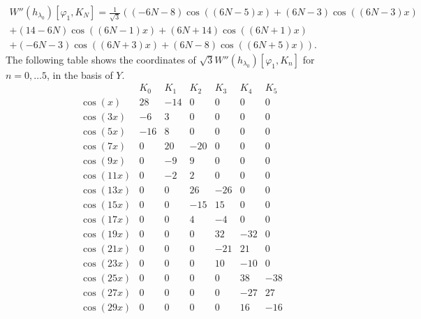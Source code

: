 \documentclass{amsart}
\begin{document}
\begin{multline}
	\label{eq_DW2}
	W''(h_{\lambda_0})[\varphi_1, K_N] =
	\frac 1{\sqrt 3} \left(
	(-6 N-8) \cos ((6 N-5) x)+(6 N-3) \cos ((6 N-3) x) \right. \\ \left. 
		+(14-6 N) \cos ((6 N-1) x)+(6 N+14) \cos ((6 N+1) x) \right. \\ \left. 
			+(-6 N-3) \cos ((6 N+3) x)+(6 N-8) \cos ((6 N+5) x)
\right).
\end{multline}
The following table shows the coordinates of $\sqrt 3 W''(h_{\lambda_0})[\varphi_1, K_n]$ for $n = 0, \ldots 5$, in the basis of $Y$.
\begin{equation}
	      \label{tab_D2}
\begin{array}{c|cccccc}
 \text{} & K_0 & K_1 & K_2 & K_3 & K_4 & K_5 \\
 \hline
 \cos (x) & 28 & -14 & 0 & 0 & 0 & 0 \\
 \cos (3 x) & -6 & 3 & 0 & 0 & 0 & 0 \\
 \cos (5 x) & -16 & 8 & 0 & 0 & 0 & 0 \\
 \cos (7 x) & 0 & 20 & -20 & 0 & 0 & 0 \\
 \cos (9 x) & 0 & -9 & 9 & 0 & 0 & 0 \\
 \cos (11 x) & 0 & -2 & 2 & 0 & 0 & 0 \\
 \cos (13 x) & 0 & 0 & 26 & -26 & 0 & 0 \\
 \cos (15 x) & 0 & 0 & -15 & 15 & 0 & 0 \\
 \cos (17 x) & 0 & 0 & 4 & -4 & 0 & 0 \\
 \cos (19 x) & 0 & 0 & 0 & 32 & -32 & 0 \\
 \cos (21 x) & 0 & 0 & 0 & -21 & 21 & 0 \\
 \cos (23 x) & 0 & 0 & 0 & 10 & -10 & 0 \\
 \cos (25 x) & 0 & 0 & 0 & 0 & 38 & -38 \\
 \cos (27 x) & 0 & 0 & 0 & 0 & -27 & 27 \\
 \cos (29 x) & 0 & 0 & 0 & 0 & 16 & -16 \\
\end{array}
\end{equation}
\end{document}
